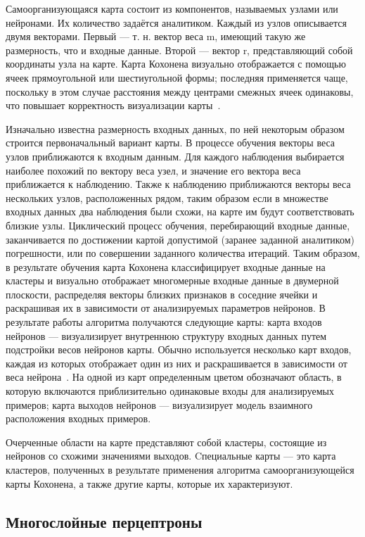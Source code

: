 Самоорганизующаяся карта состоит из компонентов, называемых узлами или нейронами.
Их количество задаётся аналитиком. Каждый из узлов описывается двумя векторами.
Первый --- т. н. вектор веса m, имеющий такую же размерность, что и входные данные.
Второй --- вектор r, представляющий собой координаты узла на карте.
Карта Кохонена визуально отображается с помощью ячеек прямоугольной или шестиугольной формы;
последняя применяется чаще, поскольку в этом случае расстояния между центрами смежных ячеек одинаковы, что повышает корректность визуализации карты~\cite{domain_kohonen}.

Изначально известна размерность входных данных, по ней некоторым образом строится первоначальный вариант карты.
В процессе обучения векторы веса узлов приближаются к входным данным.
Для каждого наблюдения выбирается наиболее похожий по вектору веса узел, и значение его вектора веса приближается к наблюдению.
Также к наблюдению приближаются векторы веса нескольких узлов, расположенных рядом, таким образом если в множестве входных данных два наблюдения были схожи, на карте им будут соответствовать близкие узлы.
Циклический процесс обучения, перебирающий входные данные, заканчивается по достижении картой допустимой (заранее заданной аналитиком) погрешности, или по совершении заданного количества итераций.
Таким образом, в результате обучения карта Кохонена классифицирует входные данные на кластеры и визуально отображает многомерные входные данные в двумерной плоскости, распределяя векторы близких признаков в соседние ячейки и раскрашивая их в зависимости от анализируемых параметров нейронов.
В результате работы алгоритма получаются следующие карты: карта входов нейронов --- визуализирует внутреннюю структуру входных данных путем подстройки весов нейронов карты.
Обычно используется несколько карт входов, каждая из которых отображает один из них и раскрашивается в зависимости от веса нейрона~\cite{domain_kohonen}.
На одной из карт определенным цветом обозначают область, в которую включаются приблизительно одинаковые входы для анализируемых примеров; карта выходов нейронов --- визуализирует модель взаимного расположения входных примеров.

Очерченные области на карте представляют собой кластеры, состоящие из нейронов со схожими значениями выходов.
Cпециальные карты — это карта кластеров, полученных в результате применения алгоритма самоорганизующейся карты Кохонена, а также другие карты, которые их характеризуют.

\subsection{Многослойные перцептроны}
\label{sub:domain:perceptrons}


